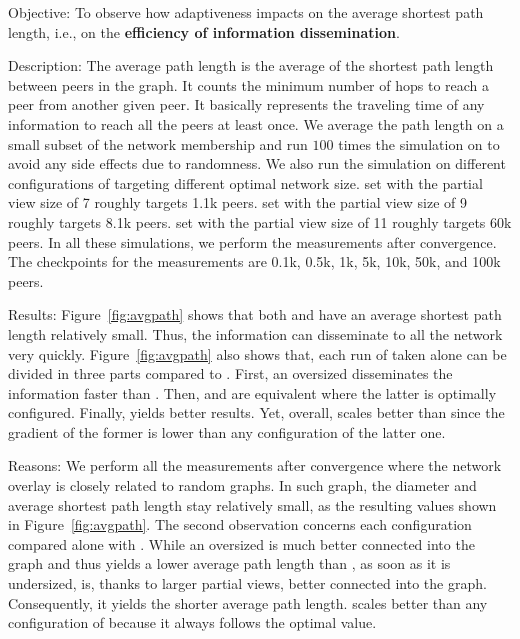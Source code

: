 \begin{asparadesc}
\item[Objective:] To observe how adaptiveness impacts on the average shortest
  path length, i.e., on the \textbf{efficiency of information dissemination}.
\item[Description:] The average path length is the average of the shortest path
  length between peers in the graph. It counts the minimum number of hops to
  reach a peer from another given peer. It basically represents the traveling
  time of any information to reach all the peers at least once. We average the
  path length on a small subset of the network membership and run $100$ times
  the simulation on \SPRAY to avoid any side effects due to randomness. We also
  run the simulation on different configurations of \CYCLON targeting different
  optimal network size. \CYCLON set with the partial view size of 7 roughly
  targets 1.1k peers. \CYCLON set with the partial view size of 9 roughly
  targets 8.1k peers. \CYCLON set with the partial view size of 11 roughly
  targets 60k peers. In all these simulations, we perform the measurements
  after convergence. The checkpoints for the measurements are 0.1k, 0.5k, 1k,
  5k, 10k, 50k, and 100k peers.
\item[Results:] Figure~\ref{fig:avgpath} shows that both \CYCLON and \SPRAY
  have an average shortest path length relatively small. Thus, the information
  can disseminate to all the network very quickly. Figure~\ref{fig:avgpath}
  also shows that, each run of \CYCLON taken alone can be divided in three
  parts compared to \SPRAY. First, an oversized \CYCLON disseminates the
  information faster than \SPRAY. Then, \SPRAY and \CYCLON are equivalent
  where the latter is optimally configured. Finally, \SPRAY yields better
  results. Yet, overall, \SPRAY scales better than \CYCLON since the
  gradient of the former is lower than any configuration of the latter one.
\item[Reasons:] We perform all the measurements after convergence where the
  network overlay is closely related to random graphs. In such graph, the
  diameter and average shortest path length stay relatively small, as the
  resulting values shown in Figure~\ref{fig:avgpath}. The second observation
  concerns each \CYCLON configuration compared alone with \SPRAY. While an
  oversized \CYCLON is much better connected into the graph and thus yields a
  lower average path length than \SPRAY, as soon as it is undersized, \SPRAY
  is, thanks to larger partial views, better connected into the graph.
  Consequently, it yields the shorter average path length. \SPRAY scales better
  than any configuration of \CYCLON because it always follows the optimal
  value.
\end{asparadesc}

